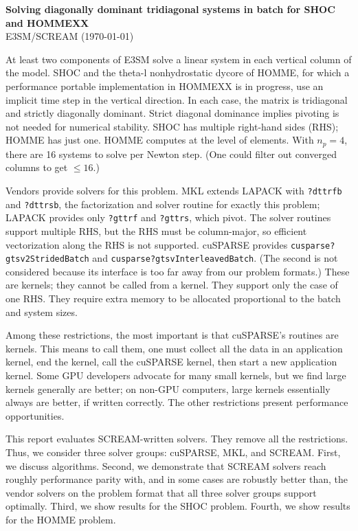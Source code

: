 \documentclass[10pt,twocolumn]{article}
\begin{document}
\sloppy

\begin{center}
  {\bf Solving diagonally dominant tridiagonal systems in batch for SHOC and HOMMEXX} \\
  E3SM/SCREAM (\today)
\end{center}

At least two components of E3SM solve a linear system in each vertical column of the model.
SHOC and the theta-l nonhydrostatic dycore of HOMME,
for which a performance portable implementation in HOMMEXX is in progress,
use an implicit time step in the vertical direction.
In each case, the matrix is tridiagonal and strictly diagonally dominant.
Strict diagonal dominance implies pivoting is not needed for numerical stability.
SHOC has multiple right-hand sides (RHS); HOMME has just one.
HOMME computes at the level of elements.
With $n_p = 4$, there are 16 systems to solve per Newton step.
(One could filter out converged columns to get $\le 16$.)

Vendors provide solvers for this problem.
MKL extends LAPACK with {\tt ?dttrfb} and {\tt ?dttrsb}, the factorization and solver routine for exactly this problem;
LAPACK provides only {\tt ?gttrf} and {\tt ?gttrs}, which pivot.
The solver routines support multiple RHS,
but the RHS must be column-major, so efficient vectorization along the RHS is not supported.
cuSPARSE provides {\tt cusparse?gtsv2StridedBatch} and {\tt cusparse?gtsvInterleavedBatch}.
(The second is not considered because its interface is too far away from our problem formats.)
These are kernels; they cannot be called from a kernel.
They support only the case of one RHS.
They require extra memory to be allocated proportional to the batch and system sizes.

Among these restrictions, the most important is that cu\-SPARSE's routines are kernels.
This means to call them, one must collect all the data in an application kernel,
end the kernel, call the cuSPARSE kernel, then start a new application kernel.
Some GPU developers advocate for many small kernels,
but we find large kernels generally are better;
on non-GPU computers, large kernels essentially always are better, if written correctly.
The other restrictions present performance opportunities.

This report evaluates SCREAM-written solvers.
They remove all the restrictions.
Thus, we consider three solver groups: cuSPARSE, MKL, and SCREAM.
First, we discuss algorithms.
Second, we demonstrate that SCREAM solvers reach roughly performance parity with,
and in some cases are robustly better than,
the vendor solvers on the problem format that all three solver groups support optimally.
Third, we show results for the SHOC problem.
Fourth, we show results for the HOMME problem.
\end{document}
